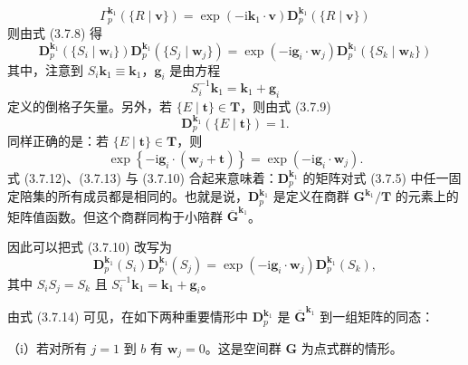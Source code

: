 \begin{equation*}
\Gamma^{\mathbf{k}_{1}}_{p}(\{R \mid \mathbf{v}\}) = \exp(-\mathrm{i}\mathbf{k}_{1} \cdot \mathbf{v})\mathbf{D}^{\mathbf{k}_{1}}_{p}(\{R \mid \mathbf{v}\})
\tag{3.7.9}
\end{equation*}
则由式 (3.7.8) 得
\begin{equation*}
\mathbf{D}^{\mathbf{k}_{1}}_{p}\left(\{S_{i} \mid \mathbf{w}_{i}\}\right)\mathbf{D}^{\mathbf{k}_{1}}_{p}\left(\{S_{j} \mid \mathbf{w}_{j}\}\right) = \exp(-\mathrm{i}\mathbf{g}_{i} \cdot \mathbf{w}_{j})\mathbf{D}^{\mathbf{k}_{1}}_{p}\left(\{S_{k} \mid \mathbf{w}_{k}\}\right)
\tag{3.7.10}
\end{equation*}
其中，注意到 $S_{i}\mathbf{k}_{1} \equiv \mathbf{k}_{1}$，$\mathbf{g}_{i}$ 是由方程
\begin{equation*}
S^{-1}_{i}\mathbf{k}_{1} = \mathbf{k}_{1} + \mathbf{g}_{i}
\tag{3.7.11}
\end{equation*}
定义的倒格子矢量。另外，若 $\{E \mid \mathbf{t}\} \in \mathbf{T}$，则由式 (3.7.9)
\begin{equation*}
\mathbf{D}^{\mathbf{k}_{1}}_{p}(\{E \mid \mathbf{t}\}) = 1.
\tag{3.7.12}
\end{equation*}
同样正确的是：若 $\{E \mid \mathbf{t}\} \in \mathbf{T}$，则
\begin{equation*}
\exp\left\{-\mathrm{i}\mathbf{g}_{i} \cdot (\mathbf{w}_{j} + \mathbf{t})\right\} = \exp(-\mathrm{i}\mathbf{g}_{i} \cdot \mathbf{w}_{j}).
\tag{3.7.13}
\end{equation*}
式 (3.7.12)、(3.7.13) 与 (3.7.10) 合起来意味着：$\mathbf{D}^{\mathbf{k}_{1}}_{p}$ 的矩阵对式 (3.7.5) 中任一固定陪集的所有成员都是相同的。也就是说，$\mathbf{D}^{\mathbf{k}_{1}}_{p}$ 是定义在商群 $\mathbf{G}^{\mathbf{k}_{1}}/\mathbf{T}$ 的元素上的矩阵值函数。但这个商群同构于小陪群 $\overline{\mathbf{G}}^{\mathbf{k}_{1}}$。

因此可以把式 (3.7.10) 改写为
\begin{equation*}
\mathbf{D}^{\mathbf{k}_{1}}_{p}(S_{i})\mathbf{D}^{\mathbf{k}_{1}}_{p}(S_{j}) = \exp(-\mathrm{i}\mathbf{g}_{i} \cdot \mathbf{w}_{j})\mathbf{D}^{\mathbf{k}_{1}}_{p}(S_{k}),
\tag{3.7.14}
\end{equation*}
其中 $S_{i}S_{j} = S_{k}$ 且 $S^{-1}_{i}\mathbf{k}_{1} = \mathbf{k}_{1} + \mathbf{g}_{i}$。

由式 (3.7.14) 可见，在如下两种重要情形中 $\mathbf{D}^{\mathbf{k}_{1}}_{p}$ 是 $\overline{\mathbf{G}}^{\mathbf{k}_{1}}$ 到一组矩阵的同态：

（i）若对所有 $j = 1$ 到 $b$ 有 $\mathbf{w}_{j} = 0$。这是空间群 $\mathbf{G}$ 为点式群的情形。

